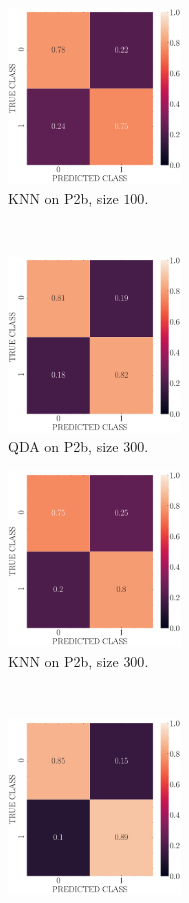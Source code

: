\documentclass[11pt, a4 paper]{article}
\begin{document}
\begin{figure}[!htbp]
\begin{subfigure}[!htbp]{0.24\textwidth}
       \centering
       \includegraphics[width=1.8in]{../results/ex2/conf_mtx_KNN_dataset_P2b_size_100.pdf}
       \caption{KNN on P2b, size $100$.}
       \label{fig:KNN_rr20_P2b_100}
    \end{subfigure}
\\
    \begin{subfigure}[!htbp]{0.24\textwidth}
       \centering
       \includegraphics[width=1.8in]{../results/ex2/conf_mtx_QD_ML_dataset_P2b_size_300.pdf}
       \caption{QDA on P2b, size $300$.}
       \label{fig:QDA_rr20_P2b_300}
    \end{subfigure}
\quad    
    \begin{subfigure}[!htbp]{0.24\textwidth}
       \centering
       \includegraphics[width=1.8in]{../results/ex2/conf_mtx_KNN_dataset_P2b_size_300.pdf}
       \caption{KNN on P2b, size $300$.}
       \label{fig:KNN_rr20_P2b_300}
    \end{subfigure}
\\
    \begin{subfigure}[!htbp]{0.24\textwidth}
       \centering
       \includegraphics[width=1.8in]{../results/ex2/conf_mtx_QD_ML_dataset_P2b_size_999.pdf}

\end{subfigure}
\end{figure}
\end{document}
